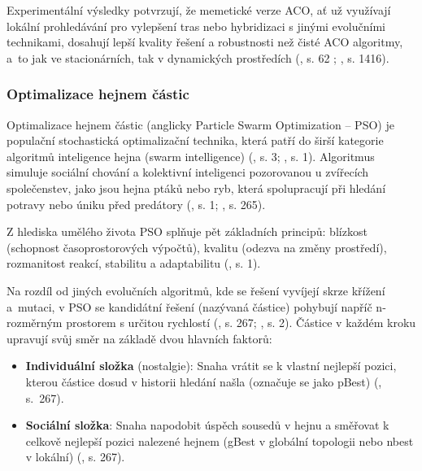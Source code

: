 \documentclass[a4paper, twoside, 12pt, czech]{article}
\begin{document}
Experimentální výsledky potvrzují, že memetické verze ACO, ať už využívají 
lokální prohledávání pro vylepšení tras nebo hybridizaci s jinými evolučními 
technikami, dosahují lepší kvality řešení a robustnosti než čisté ACO algoritmy, 
a~to jak ve stacionárních, tak v dynamických prostředích (\cite{Fidanova2021-qg}, s. 62 ; \cite{dynamic-aco}, s. 1416).

\subsubsection{Optimalizace hejnem částic}
Optimalizace hejnem částic (anglicky Particle Swarm Optimization – PSO) je populační 
stochastická optimalizační technika, která patří do širší kategorie algoritmů 
inteligence hejna (swarm intelligence) (\cite{evolutionaryOptimizationAlgos}, s. 3;
\cite{pso-overview}, s. 1). Algoritmus simuluje sociální chování a 
kolektivní inteligenci pozorovanou u zvířecích společenstev, jako jsou hejna 
ptáků nebo ryb, která spolupracují při hledání potravy nebo úniku před 
predátory (\cite{pso-overview}, s. 1; \cite{evolutionaryOptimizationAlgos}, s. 265).


Z hlediska umělého života PSO splňuje pět základních principů: blízkost 
(schopnost časoprostorových výpočtů), kvalitu (odezva na změny prostředí), 
rozmanitost reakcí, stabilitu a adaptabilitu (\cite{pso-overview}, s. 1).

Na rozdíl od jiných evolučních algoritmů, kde se řešení vyvíjejí skrze 
křížení a~mutaci, v PSO se kandidátní řešení (nazývaná částice) pohybují napříč
n-rozměr\-ným prostorem s určitou rychlostí (\cite{evolutionaryOptimizationAlgos}, s. 267;  
\cite{pso-overview}, s. 2). Částice v každém kroku upravují svůj směr na základě dvou 
hlavních faktorů:
\begin{itemize}
    \item \textbf{Individuální složka} (nostalgie): Snaha vrátit se k vlastní nejlepší 
    pozici, kterou částice dosud v historii hledání našla (označuje se jako pBest) 
    (\cite{evolutionaryOptimizationAlgos}, s.~267).
    \item \textbf{Sociální složka}: Snaha napodobit úspěch sousedů v hejnu a směřovat k~
    celkově nejlepší pozici nalezené hejnem (gBest v globální topologii nebo 
    nbest v lokální) (\cite{evolutionaryOptimizationAlgos}, s. 267).
\end{itemize}
\end{document}
